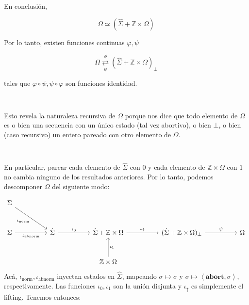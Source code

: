 \documentclass[a4paper, 12pt]{article}
\begin{document}
~

~ 

~ 


~ 

En conclusión,

\begin{equation*}
  \Omega \simeq \left( \hat{\Sigma} + \mathbb{Z} \times \Omega \right) 
\end{equation*}

Por lo tanto, existen funciones continuas $\varphi, \psi$

\begin{equation*}
  \Omega 
\underset{\psi}{\overset{\phi}{\rightleftarrows}} 
\left( \hat{\Sigma} + \mathbb{Z} \times \Omega \right)_{\perp}
\end{equation*}

tales que $\varphi \circ \psi, \psi \circ \varphi$ son funciones identidad.

~

\begin{helpframe}
  Esto revela la naturaleza recursiva de $\Omega$ porque nos dice que todo
  elemento de $\Omega$ es o bien una secuencia con un único estado (tal vez
  abortivo), o bien $\bot$, o bien (caso recursivo) un entero pareado con otro
  elemento de $\Omega$.
\end{helpframe}

~

En particular, parear cada elemento de $\hat{\Sigma}$ con $0$ y cada elemento de
$\mathbb{Z} \times \Omega$ con $1$ no cambia ninguno de los resultados
anteriores. Por lo tanto, podemos descomponer $\Omega$ del siguiente modo:

\[
\begin{tikzcd}[row sep=large, column sep=huge]
\Sigma \arrow[dr, "\iota_{\text{norm}}"'] & \\
\Sigma \arrow[r, "\iota_{\text{abnorm}}"'] & \hat{\Sigma} \arrow[r, "\iota_0"] &
\hat{\Sigma}+ \mathbb{Z} \times \Omega \arrow[r, "\iota_{\uparrow}"] & (\hat{\Sigma} + \mathbb{Z} \times \Omega)_{\perp} \arrow[r, "\psi"] & \Omega \\
& & \mathbb{Z} \times \Omega \arrow[u, "\iota_1"']
\end{tikzcd}
\]
Acá, $\iota_{\text{norm}}, \iota_{\text{abnorm}}$ inyectan estados en
$\hat{\Sigma}$, mapeando $\sigma \mapsto \sigma$ y $\sigma \mapsto
\left<\textbf{abort}, \sigma \right>$, respectivamente. Las funciones $\iota_0,
\iota_1$ son la unión disjunta y $\iota_\uparrow$ es simplemente el lifting.
Tenemos entonces:
\end{document}
